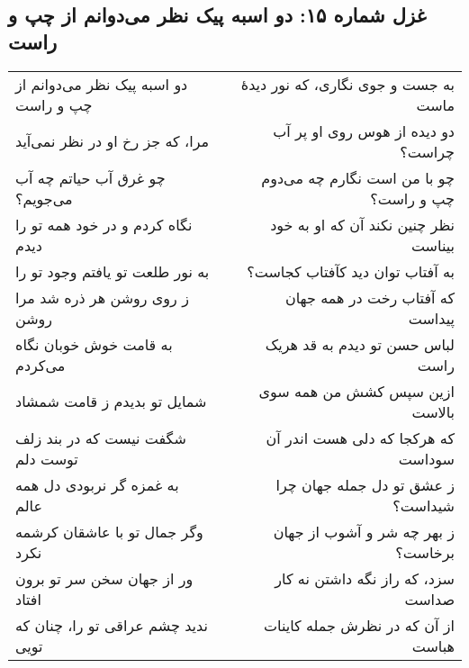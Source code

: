 \begin{center}
\section*{غزل شماره ۱۵: دو اسبه پیک نظر می‌دوانم از چپ و راست}
\label{sec:015}
\begin{longtable}{l p{0.5cm} r}
دو اسبه پیک نظر می‌دوانم از چپ و راست
&&
به جست و جوی نگاری، که نور دیدهٔ ماست
\\
مرا، که جز رخ او در نظر نمی‌آید
&&
دو دیده از هوس روی او پر آب چراست؟
\\
چو غرق آب حیاتم چه آب می‌جویم؟
&&
چو با من است نگارم چه می‌دوم چپ و راست؟
\\
نگاه کردم و در خود همه تو را دیدم
&&
نظر چنین نکند آن که او به خود بیناست
\\
به نور طلعت تو یافتم وجود تو را
&&
به آفتاب توان دید کآفتاب کجاست؟
\\
ز روی روشن هر ذره شد مرا روشن
&&
که آفتاب رخت در همه جهان پیداست
\\
به قامت خوش خوبان نگاه می‌کردم
&&
لباس حسن تو دیدم به قد هریک راست
\\
شمایل تو بدیدم ز قامت شمشاد
&&
ازین سپس کشش من همه سوی بالاست
\\
شگفت نیست که در بند زلف توست دلم
&&
که هرکجا که دلی هست اندر آن سوداست
\\
به غمزه گر نربودی دل همه عالم
&&
ز عشق تو دل جمله جهان چرا شیداست؟
\\
وگر جمال تو با عاشقان کرشمه نکرد
&&
ز بهر چه شر و آشوب از جهان برخاست؟
\\
ور از جهان سخن سر تو برون افتاد
&&
سزد، که راز نگه داشتن نه کار صداست
\\
ندید چشم عراقی تو را، چنان که تویی
&&
از آن که در نظرش جمله کاینات هباست
\\
\end{longtable}
\end{center}
